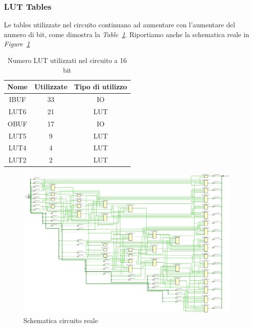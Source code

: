 \subsubsection{LUT Tables}
Le tables utilizzate nel circuito continuano ad aumentare con l'aumentare del numero di bit, come dimostra la \textit{Table~\ref{lut_quantity_16bit}}. Riportiamo anche la schematica reale in \textit{Figure~\ref{lut_schematic_16bit}}
\begin{table}[ht]
      \centering
      \begin{tabular}{|c|c|c|}
        \hline
        Nome & Utilizzate & Tipo di utilizzo \\ \hline
        IBUF & 33 & IO \\ \hline
        LUT6 & 21 & LUT \\ \hline
        OBUF & 17 & IO \\ \hline
        LUT5 & 9 & LUT \\ \hline
        LUT4 & 4 & LUT \\ \hline
        LUT2 & 2 & LUT \\ \hline 
      \end{tabular}
      \caption{Numero LUT utilizzati nel circuito a 16 bit}
      \label{lut_quantity_16bit}
\end{table}
\begin{figure}[ht]
  \centering
  \includegraphics[width=1\textwidth]{assets/LUT/16bit/LUT_schematic_16bit.png}
  \caption{Schematica circuito reale}
  \label{lut_schematic_16bit}
\end{figure}

